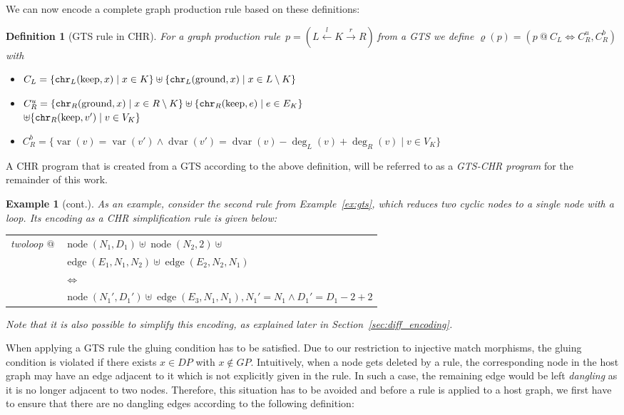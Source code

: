 \documentclass{tlp}
\newtheorem{example}{Example}[section]
\newtheorem{definition}{Definition}[section]
\DeclareMathOperator{\var}{var}
\DeclareMathOperator{\dvar}{dvar}
\DeclareMathOperator{\gnd}{ground}
\DeclareMathOperator{\kp}{keep}
\DeclareMathOperator{\node}{node}
\DeclareMathOperator{\edge}{edge}
\newcommand{\chr}{\ensuremath{{\tt chr}}}
\newcommand{\chrrule}{\ensuremath{\varrho}}
\newcommand{\prodrule}{\ensuremath{p = (L \stackrel{l}{\leftarrow} K
\stackrel{r}{\rightarrow} R)\ }}
\begin{document}
We can now encode a complete graph production rule based on these definitions:

\begin{definition}[GTS rule in CHR]
\label{def:chr_rule}
For a graph production rule~\prodrule from a GTS we define $\chrrule(p) =
(p\ @\ C_L \Leftrightarrow C_R^u, C_R^b)$ with
\begin{itemize}
  \item $C_L = \{ \chr_L(\kp, x) \mid x \in K \} \uplus \{ \chr_L(\gnd, x) \mid
  x \in L \setminus K \}$
  \item $C_R^u = \{ \chr_R(\gnd, x) \mid x \in R \setminus K\} \uplus
  \{\chr_R(\kp, e) \mid e \in E_K \}$\\ $\uplus \{ \chr_R(\kp, v') \mid v
  \in V_K\}$
  \item $C_R^b = \{ \var(v) = \var(v') \land \dvar(v') =
  \dvar(v){-}\deg_L(v){+}\deg_R(v) \mid v \in V_K \}$
\end{itemize}
\end{definition}

A CHR program that is created from a GTS according to the above definition, will
be referred to as a \emph{GTS-CHR program} for the remainder of this work.

\begin{example}[cont.]\label{ex:twoloop}As an example, consider the second rule
from Example~\ref{ex:gts}, which reduces two cyclic nodes to a single node with
a loop. Its encoding as a CHR simplification rule is given below: \\
\begin{tabular}{ll} 
twoloop $@$ & $\node(N_1, D_1) \uplus \node(N_2, 2) \uplus$\\
& $\edge(E_1, N_1, N_2) \uplus \edge(E_2, N_2, N_1)$\\
& $\Leftrightarrow$\\
& $\node(N_1', D_1') \uplus \edge(E_3, N_1, N_1), N_1' = N_1 \land D_1' =
D_1{-}2{+}2$
\end{tabular}

Note that it is also possible to simplify this encoding, as explained later in
Section~\ref{sec:diff_encoding}.
\end{example}

When applying a GTS rule the gluing condition has to be satisfied. Due to our
restriction to injective match morphisms, the gluing condition is violated if
there exists $x \in DP$ with $x \not \in GP$. Intuitively, when a node gets
deleted by a rule, the corresponding node in the host graph may have an edge
adjacent to it which is not explicitly given in the rule. In such a case, the
remaining edge would be left \emph{dangling} as it is no longer adjacent to two
nodes. Therefore, this situation has to be avoided and before a rule is applied
to a host graph, we first have to ensure that there are no dangling edges
according to the following definition:
\end{document}
